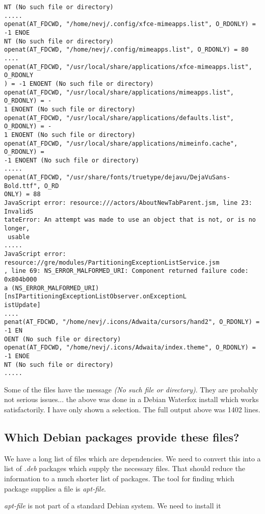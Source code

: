 \documentclass[a4paper]{article}  %
\begin{document}
\begin{tcolorbox}[breakable]
\begin{verbatim}
NT (No such file or directory)
.....
openat(AT_FDCWD, "/home/nevj/.config/xfce-mimeapps.list", O_RDONLY) = -1 ENOE
NT (No such file or directory)
openat(AT_FDCWD, "/home/nevj/.config/mimeapps.list", O_RDONLY) = 80
....
openat(AT_FDCWD, "/usr/local/share/applications/xfce-mimeapps.list", O_RDONLY
) = -1 ENOENT (No such file or directory)
openat(AT_FDCWD, "/usr/local/share/applications/mimeapps.list", O_RDONLY) = -
1 ENOENT (No such file or directory)
openat(AT_FDCWD, "/usr/local/share/applications/defaults.list", O_RDONLY) = -
1 ENOENT (No such file or directory)
openat(AT_FDCWD, "/usr/local/share/applications/mimeinfo.cache", O_RDONLY) = 
-1 ENOENT (No such file or directory)
.....
openat(AT_FDCWD, "/usr/share/fonts/truetype/dejavu/DejaVuSans-Bold.ttf", O_RD
ONLY) = 88
JavaScript error: resource:///actors/AboutNewTabParent.jsm, line 23: InvalidS
tateError: An attempt was made to use an object that is not, or is no longer,
 usable
.....
JavaScript error: resource://gre/modules/PartitioningExceptionListService.jsm
, line 69: NS_ERROR_MALFORMED_URI: Component returned failure code: 0x804b000
a (NS_ERROR_MALFORMED_URI) [nsIPartitioningExceptionListObserver.onExceptionL
istUpdate]
....
penat(AT_FDCWD, "/home/nevj/.icons/Adwaita/cursors/hand2", O_RDONLY) = -1 EN
OENT (No such file or directory)
openat(AT_FDCWD, "/home/nevj/.icons/Adwaita/index.theme", O_RDONLY) = -1 ENOE
NT (No such file or directory)
.....
\end{verbatim}
\end{tcolorbox}
 Some of the files have the message {\em (No such file or directory)}. They are probably not serious issues... the above was done in a Debian Waterfox install which works satisfactorily. I have only shown a selection. The full output above was 1402 lines. 


\subsection{Which Debian packages provide these files?}
We have a long list of files which are dependencies. We need to convert this into a list of {\em .deb} packages which supply the necessary files.  That should reduce the information to a much shorter list of packages. The tool for finding which package supplies a file is {\em apt-file}.

{\em apt-file} is not part of a standard Debian system. We need to install it
\end{document}
